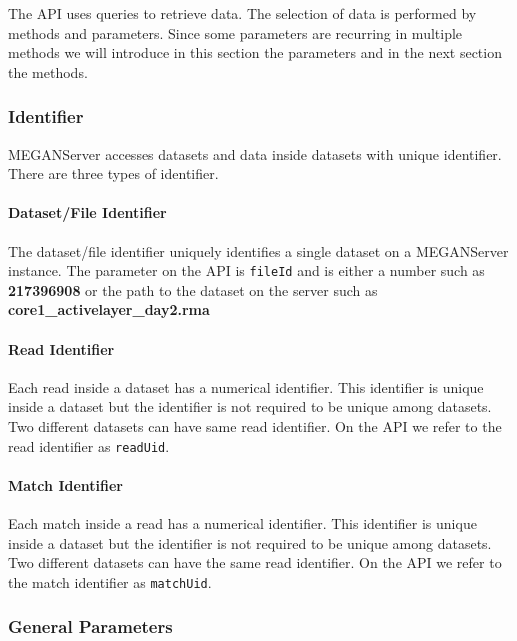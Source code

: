 \documentclass[11pt]{article}
\begin{document}
The API uses queries to retrieve data. The selection of data is performed by methods and parameters. Since some parameters are recurring in multiple methods we will introduce in this section the parameters and in the next section the methods.


\subsubsection{Identifier}

MEGANServer accesses datasets and data inside datasets with unique identifier. There are three types of identifier.

\paragraph{Dataset/File Identifier}
\label{subsec:fileid}

The dataset/file identifier uniquely identifies a single dataset on a MEGANServer instance. The parameter on the API is \texttt{fileId} and is either a number such as \textbf{217396908} or the path to the dataset on the server such as \textbf{core1\_activelayer\_day2.rma}

\paragraph{Read Identifier}
\label{subsec:readuid}

Each read inside a dataset has a numerical identifier. This identifier is unique inside a dataset but the identifier is not required to be unique among datasets. Two different datasets can have same read identifier. On the API we refer to the read identifier as \texttt{readUid}.

\paragraph{Match Identifier}
\label{subsec:matchuid}

Each match inside a read has a numerical identifier. This identifier is unique inside a dataset but the identifier is not required to be unique among datasets. Two different datasets can have the same read identifier. On the API we refer to the match identifier as \texttt{matchUid}.


\subsubsection{General Parameters}
\end{document}
